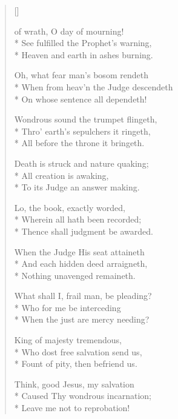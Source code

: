 \newHymn
{}

\begin{verse}[\versewidth]

 of wrath, O day of mourning!\\*
        See fulfilled the Prophet's warning,\\*
        Heaven and earth in ashes burning.
	\pointorig

 Oh, what fear man's bosom rendeth\\*
        When from heav'n the Judge descendeth\\*
        On whose sentence all dependeth!

 Wondrous sound the trumpet flingeth,\\*
        Thro' earth's sepulchers it ringeth,\\*
        All before the throne it bringeth.

 Death is struck and nature quaking;\\*
        All creation is awaking,\\*
        To its Judge an answer making.



 Lo, the book, exactly worded,\\*
        Wherein all hath been recorded;\\*
        Thence shall judgment be awarded.

 When the Judge His seat attaineth\\*
        And each hidden deed arraigneth,\\*
        Nothing unavenged remaineth.



 What shall I, frail man, be pleading?\\*
        Who for me be interceding\\*
        When the just are mercy needing?

 King of majesty tremendous,\\*
        Who dost free salvation send us,\\*
        Fount of pity, then befriend us.

 Think, good Jesus, my salvation\\*
        Caused Thy wondrous incarnation;\\*
        Leave me not to reprobation!


\end{verse}
